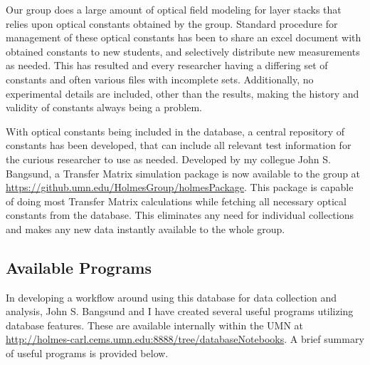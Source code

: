 \documentclass[../thesis.tex]{subfiles}
\begin{document}
Our group does a large amount of optical field modeling for layer stacks that relies upon optical constants obtained by the group.
Standard procedure for management of these optical constants has been to share an excel document with obtained constants to new students, and selectively distribute new measurements as needed.
This has resulted and every researcher having a differing set of constants and often various files with incomplete sets.
Additionally, no experimental details are included, other than the results, making the history and validity of constants always being a problem.

With optical constants being included in the database, a central repository of constants has been developed, that can include all relevant test information for the curious researcher to use as needed.
Developed by my collegue John S. Bangsund, a Transfer Matrix simulation package is now available to the group at \url{https://github.umn.edu/HolmesGroup/holmesPackage}.
This package is capable of doing most Transfer Matrix calculations while fetching all necessary optical constants from the database.
This eliminates any need for individual collections and makes any new data instantly available to the whole group.

\subsection{Available Programs}

In developing a workflow around using this database for data collection and analysis, John S. Bangsund and I have created several useful programs utilizing database features.
These are available internally within the UMN at \url{http://holmes-carl.cems.umn.edu:8888/tree/databaseNotebooks}.
A brief summary of useful programs is provided below.
\end{document}

